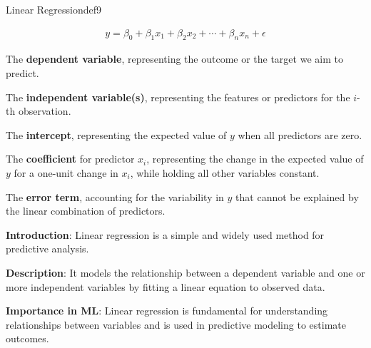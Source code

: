 \documentclass[
  12 pt,
  a4paper,
]{book}
\numberwithin{equation}{section}
\theoremstyle{plain}      %
\theoremstyle{definition} %
\theoremstyle{remark}     %
\theoremstyle{note}         %
\begin{document}
\begin{a_def_eq}{Linear Regression}{def9} 

\begin{align}
y = \beta_0 + \beta_1 x_1 + \beta_2 x_2 + \cdots + \beta_n x_n + \epsilon
\end{align}


\begin{description}[align=left, labelwidth=2cm, labelsep=0em, leftmargin=2cm]
    \item[$y$] The \textbf{dependent variable}, representing the outcome or the target we aim to predict.
    \vspace{0.5\baselineskip}
    \item[$x_i$] The \textbf{independent variable(s)}, representing the features or predictors for the \( i \)-th observation.
    \vspace{0.5\baselineskip}
    \item[$\beta_0$] The \textbf{intercept}, representing the expected value of \( y \) when all predictors are zero.
    \vspace{0.5\baselineskip}
    \item[$\beta_i$] The \textbf{coefficient} for predictor \( x_i \), representing the change in the expected value of \( y \) for a one-unit change in \( x_i \), while holding all other variables constant.
    \vspace{0.5\baselineskip}
    \item[$\epsilon$] The \textbf{error term}, accounting for the variability in \( y \) that cannot be explained by the linear combination of predictors.
    \vspace{0.5\baselineskip}
\end{description}

\end{a_def_eq}

\hfill\break

\textbf{Introduction}: Linear regression is a simple and widely used
method for predictive analysis.

\textbf{Description}: It models the relationship between a dependent
variable and one or more independent variables by fitting a linear
equation to observed data.

\textbf{Importance in ML}: Linear regression is fundamental for
understanding relationships between variables and is used in predictive
modeling to estimate outcomes.

\vspace*{\fill}
\end{document}
